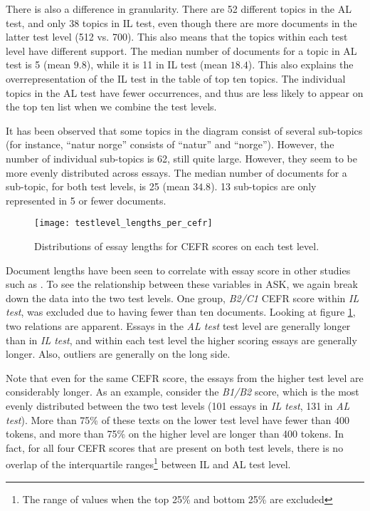 There is also a difference in granularity. There are 52 different topics in
the AL test, and only 38 topics in IL test, even though there are more
documents in the latter test level (512 vs. 700). This also means that the
topics within each test level have different support. The median number of
documents for a topic in AL test is 5 (mean $9.8$), while it is 11 in IL test
(mean $18.4$). This also explains the overrepresentation of the IL test in
the table of top ten topics. The individual topics in the AL test have fewer
occurrences, and thus are less likely to appear on the top ten list when we
combine the test levels.

It has been observed that some topics in the diagram consist of several
sub-topics (for instance, ``natur norge'' consists of ``natur'' and
``norge''). However, the number of individual sub-topics is 62, still quite
large. However, they seem to be more evenly distributed across essays. The
median number of documents for a sub-topic, for both test levels, is 25 (mean
$34.8$). 13 sub-topics are only represented in 5 or fewer documents.

\begin{figure}
  \centering
  \texttt{[image: testlevel\_lengths\_per\_cefr]}
  \caption[Document lengths on each CEFR level]{
    Distributions of essay lengths for CEFR scores on each test level.
  }
  \label{fig:testlevel-lengths-per-cefr}
\end{figure}

Document lengths have been seen to correlate with essay score in other
studies such as \textcite{vajjala17}. To see the relationship between these
variables in ASK, we again break down the data into the two test levels. One
group, \emph{B2/C1} CEFR score within \emph{IL test}, was excluded due to
having fewer than ten documents. Looking at figure
\ref{fig:testlevel-lengths-per-cefr}, two relations are apparent. Essays in
the \emph{AL test} test level are generally longer than in \emph{IL test},
and within each test level the higher scoring essays are generally longer.
Also, outliers are generally on the long side.

Note that even for the same CEFR score, the essays from the higher test level
are considerably longer. As an example, consider the \emph{B1/B2} score,
which is the most evenly distributed between the two test levels (101 essays
in \emph{IL test}, 131 in \emph{AL test}). More than 75\% of these texts on
the lower test level have fewer than 400 tokens, and more than 75\% on the
higher level are longer than 400 tokens. In fact, for all four CEFR scores
that are present on both test levels, there is no overlap of the
interquartile ranges\footnote{The range of values when the top 25\% and
bottom 25\% are excluded} between IL and AL test level.


